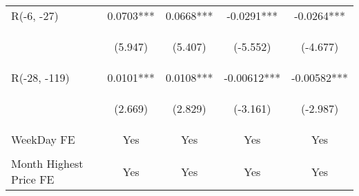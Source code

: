 \documentclass[border=0.2cm]{standalone}
\begin{document}
\begin{tabular}{lcccc}
    R(-6, -27)             & 0.0703***                                      & 0.0668***                                      & -0.0291***                                      & -0.0264***                                     \\
    \vspace{4pt}           & \begin{footnotesize}(5.947)\end{footnotesize}  & \begin{footnotesize}(5.407)\end{footnotesize}  & \begin{footnotesize}(-5.552)\end{footnotesize}  & \begin{footnotesize}(-4.677)\end{footnotesize} \\
    R(-28, -119)           & 0.0101***                                      & 0.0108***                                      & -0.00612***                                     & -0.00582***                                    \\
    \vspace{12pt}          & \begin{footnotesize}(2.669)\end{footnotesize}  & \begin{footnotesize}(2.829)\end{footnotesize}  & \begin{footnotesize}(-3.161)\end{footnotesize}  & \begin{footnotesize}(-2.987)\end{footnotesize} \\
    WeekDay FE             & Yes                                            & Yes                                            & Yes                                             & Yes                                            \\
    \vspace{4pt}           &                                                &                                                &                                                 &                                                \\
    Month Highest Price FE & Yes                                            & Yes                                            & Yes                                             & Yes                                            \\

\end{tabular}
\end{document}
